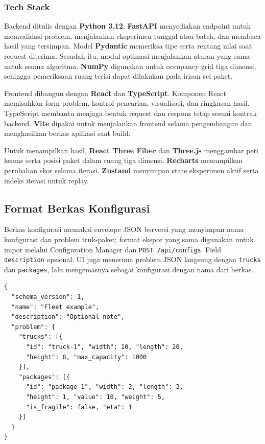 \documentclass[12pt,a4paper]{article}
\begin{document}
\subsubsection{Tech Stack}
Backend ditulis dengan \textbf{Python 3.12}. \textbf{FastAPI} menyediakan endpoint untuk memvalidasi problem, menjalankan eksperimen tunggal atau batch, dan membaca hasil yang tersimpan. Model \textbf{Pydantic} memeriksa tipe serta rentang nilai saat request diterima. Sesudah itu, modul optimasi menjalankan aturan yang sama untuk semua algoritma. \textbf{NumPy} digunakan untuk occupancy grid tiga dimensi, sehingga pemeriksaan ruang terisi dapat dilakukan pada irisan sel paket.

Frontend dibangun dengan \textbf{React} dan \textbf{TypeScript}. Komponen React memisahkan form problem, kontrol pencarian, visualisasi, dan ringkasan hasil. TypeScript membantu menjaga bentuk request dan respons tetap sesuai kontrak backend. \textbf{Vite} dipakai untuk menjalankan frontend selama pengembangan dan menghasilkan berkas aplikasi saat build.

Untuk menampilkan hasil, \textbf{React Three Fiber} dan \textbf{Three.js} menggambar peti kemas serta posisi paket dalam ruang tiga dimensi. \textbf{Recharts} menampilkan perubahan skor selama iterasi. \textbf{Zustand} menyimpan state eksperimen aktif serta indeks iterasi untuk replay.

\subsection{Format Berkas Konfigurasi}
Berkas konfigurasi memakai envelope JSON berversi yang menyimpan nama konfigurasi dan problem truk-paket; format ekspor yang sama digunakan untuk impor melalui Configuration Manager dan \texttt{POST /api/configs}. Field \texttt{description} opsional. UI juga menerima problem JSON langsung dengan \texttt{trucks} dan \texttt{packages}, lalu mengemasnya sebagai konfigurasi dengan nama dari berkas.

\begin{lstlisting}[language={},frame=single,basicstyle=\ttfamily\footnotesize,caption={Contoh envelope berkas konfigurasi JSON},label={lst:config-envelope}]
{
  "schema_version": 1,
  "name": "Fleet example",
  "description": "Optional note",
  "problem": {
    "trucks": [{
      "id": "truck-1", "width": 10, "length": 20,
      "height": 8, "max_capacity": 1000
    }],
    "packages": [{
      "id": "package-1", "width": 2, "length": 3,
      "height": 1, "value": 10, "weight": 5,
      "is_fragile": false, "eta": 1
    }]
  }
}
\end{lstlisting}
\end{document}
